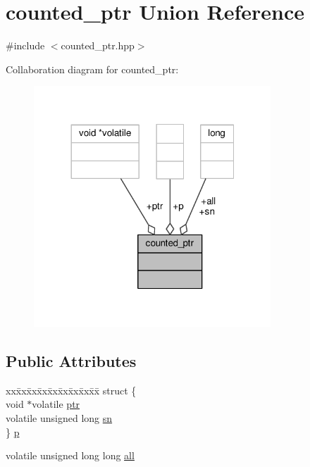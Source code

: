 \hypertarget{unioncounted__ptr}{\section{counted\-\_\-ptr Union Reference}
\label{unioncounted__ptr}
}


{\ttfamily \#include $<$counted\-\_\-ptr.\-hpp$>$}



Collaboration diagram for counted\-\_\-ptr\-:
\nopagebreak
\begin{figure}[H]
\begin{center}
\leavevmode
\includegraphics[width=252pt]{unioncounted__ptr__coll__graph}
\end{center}
\end{figure}
\subsection*{Public Attributes}
\begin{DoxyCompactItemize}
\item 
\begin{tabbing}
xx\=xx\=xx\=xx\=xx\=xx\=xx\=xx\=xx\=\kill
struct \{\\
\>void $\ast$volatile \hyperlink{unioncounted__ptr_ad89a77929a97e242aae96601a3e4d6c6}{ptr}\\
\>volatile unsigned long \hyperlink{unioncounted__ptr_aaccb382672a1ba4e91dd8dae03010069}{sn}\\
\} \hyperlink{unioncounted__ptr_ade3e233814206e384de576f266f86a85}{p}\\

\end{tabbing}\item 
volatile unsigned long long \hyperlink{unioncounted__ptr_a3c019eb2e8a407efe66a4aa8255c5f5b}{all}
\end{DoxyCompactItemize}


